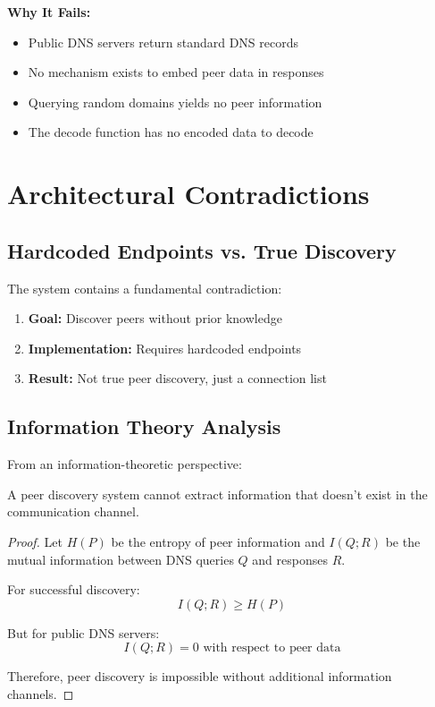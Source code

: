 \documentclass[12pt,a4paper]{article}
\begin{document}
\textbf{Why It Fails:}
\begin{itemize}
    \item Public DNS servers return standard DNS records
    \item No mechanism exists to embed peer data in responses
    \item Querying random domains yields no peer information
    \item The decode function has no encoded data to decode
\end{itemize}

\section{Architectural Contradictions}

\subsection{Hardcoded Endpoints vs. True Discovery}

The system contains a fundamental contradiction:

\begin{enumerate}
    \item \textbf{Goal:} Discover peers without prior knowledge
    \item \textbf{Implementation:} Requires hardcoded endpoints
    \item \textbf{Result:} Not true peer discovery, just a connection list
\end{enumerate}

\subsection{Information Theory Analysis}

From an information-theoretic perspective:

\begin{theorem}
A peer discovery system cannot extract information that doesn't exist in the communication channel.
\end{theorem}

\begin{proof}
Let $H(P)$ be the entropy of peer information and $I(Q;R)$ be the mutual information between DNS queries $Q$ and responses $R$.

For successful discovery:
\begin{equation}
    I(Q;R) \geq H(P)
\end{equation}

But for public DNS servers:
\begin{equation}
    I(Q;R) = 0 \text{ with respect to peer data}
\end{equation}

Therefore, peer discovery is impossible without additional information channels.
\end{proof}
\end{document}
